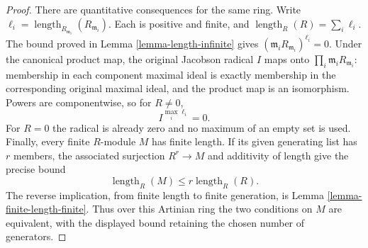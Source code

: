 \begin{proof}
There are quantitative consequences for the same ring.
Write $\ell_i=\operatorname{length}_{R_{\mathfrak m_i}}
(R_{\mathfrak m_i})$. Each is positive and finite, and
$\operatorname{length}_R(R)=\sum_i\ell_i$.
The bound proved in Lemma \ref{lemma-length-infinite} gives
$(\mathfrak m_iR_{\mathfrak m_i})^{\ell_i}=0$.
Under the canonical product map, the original Jacobson radical
$I$ maps onto $\prod_i\mathfrak m_iR_{\mathfrak m_i}$:
membership in each component maximal ideal is exactly membership
in the corresponding original maximal ideal, and the product
map is an isomorphism. Powers are componentwise, so for
$R\neq0$,
$$
I^{\max_i\ell_i}=0.
$$
For $R=0$ the radical is already zero and no maximum of an empty
set is used.
Finally, every finite $R$-module $M$ has finite length. If its
given generating list has $r$ members, the associated surjection
$R^r\to M$ and additivity of length give the precise bound
$$
\operatorname{length}_R(M)\leq
r\operatorname{length}_R(R).
$$
The reverse implication, from finite length to finite generation,
is Lemma \ref{lemma-finite-length-finite}. Thus over this
Artinian ring the two conditions on $M$ are equivalent, with
the displayed bound retaining the chosen number of generators.
\end{proof}